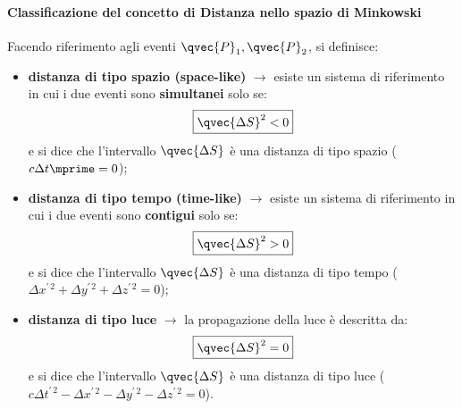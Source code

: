 \paragraph{Classificazione del concetto di Distanza nello spazio di Minkowski}
Facendo riferimento agli eventi $\qvec{P}_1, \qvec{P}_2$, si definisce:
\begin{itemize}
	\item \textbf{distanza di tipo spazio (space-like)} $\rightarrow$ esiste un
	      sistema di riferimento in cui i due eventi sono \textbf{simultanei} solo
	      se:
	      \begin{equation}
		      \boxed{\qvec{\Delta S}^2 < 0}
	      \end{equation}
	      e si dice che l'intervallo $\qvec{\Delta S}$ è una distanza di tipo spazio
	      ($c \Delta t \mprime = 0$);
	\item \textbf{distanza di tipo tempo (time-like)} $\rightarrow$ esiste un
	      sistema di riferimento in cui i due eventi sono \textbf{contigui} solo se:
	      \begin{equation}
		      \boxed{\qvec{\Delta S}^2 > 0}
	      \end{equation}
	      e si dice che l'intervallo $\qvec{\Delta S}$ è una distanza di tipo tempo
	      ($\Delta x ^{\prime\, 2} + \Delta y ^{\prime\, 2} + \Delta z ^{\prime\, 2}
		      = 0$);
	\item \textbf{distanza di tipo luce} $\rightarrow$ la propagazione della luce
	      è descritta da:
	      \begin{equation}
		      \boxed{\qvec{\Delta S}^2 = 0}
	      \end{equation}
	      e si dice che l'intervallo $\qvec{\Delta S}$ è una distanza di tipo luce
	      ($c \Delta t ^{\prime\, 2} - \Delta x ^{\prime\, 2} - \Delta y ^{\prime\, 2}
		      - \Delta z ^{\prime\, 2} = 0$).
\end{itemize}

